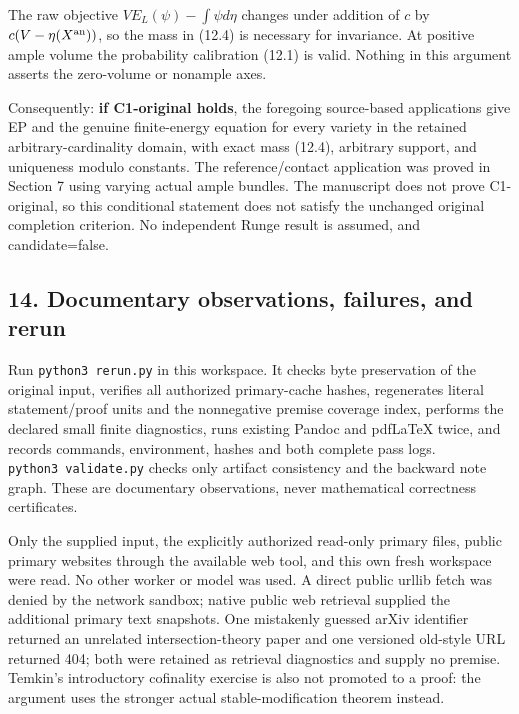 \documentclass[
  10pt,
]{article}
\begin{document}
The raw objective \(VE_L(\psi)-\int\psi d\eta\) changes under addition
of \(c\) by \(c(V-\eta(X^{\rm an}))\), so the mass in (12.4) is
necessary for invariance. At positive ample volume the probability
calibration (12.1) is valid. Nothing in this argument asserts the
zero-volume or nonample axes.

Consequently: \textbf{if C1-original holds}, the foregoing source-based
applications give EP and the genuine finite-energy equation for every
variety in the retained arbitrary-cardinality domain, with exact mass
(12.4), arbitrary support, and uniqueness modulo constants. The
reference/contact application was proved in Section 7 using varying
actual ample bundles. The manuscript does not prove C1-original, so this
conditional statement does not satisfy the unchanged original completion
criterion. No independent Runge result is assumed, and candidate=false.

\subsection{14. Documentary observations, failures, and
rerun}\label{documentary-observations-failures-and-rerun}

Run \texttt{python3\ rerun.py} in this workspace. It checks byte
preservation of the original input, verifies all authorized
primary-cache hashes, regenerates literal statement/proof units and the
nonnegative premise coverage index, performs the declared small finite
diagnostics, runs existing Pandoc and pdfLaTeX twice, and records
commands, environment, hashes and both complete pass logs.
\texttt{python3\ validate.py} checks only artifact consistency and the
backward note graph. These are documentary observations, never
mathematical correctness certificates.

Only the supplied input, the explicitly authorized read-only primary
files, public primary websites through the available web tool, and this
own fresh workspace were read. No other worker or model was used. A
direct public urllib fetch was denied by the network sandbox; native
public web retrieval supplied the additional primary text snapshots. One
mistakenly guessed arXiv identifier returned an unrelated
intersection-theory paper and one versioned old-style URL returned 404;
both were retained as retrieval diagnostics and supply no premise.
Temkin's introductory cofinality exercise is also not promoted to a
proof: the argument uses the stronger actual stable-modification theorem
instead.
\end{document}
